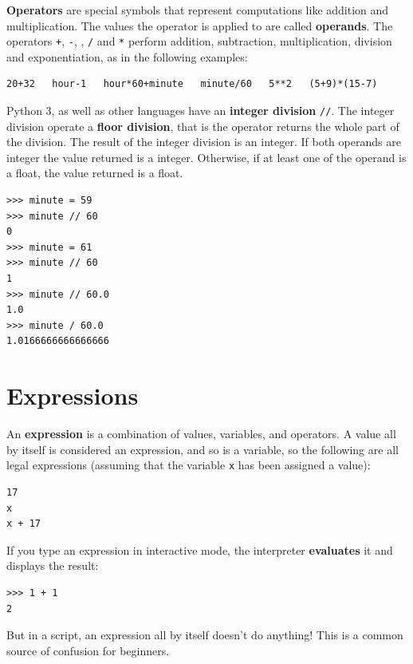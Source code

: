 {\bf Operators} are special symbols that represent computations like
addition and multiplication.  The values the operator is applied to
are called {\bf operands}.
The operators {\tt +}, {\tt -}, {\tt *}, {\tt /} and {\tt **}
perform addition, subtraction, multiplication, division and
exponentiation, as in the following examples:

\beforeverb
\begin{verbatim}
20+32   hour-1   hour*60+minute   minute/60   5**2   (5+9)*(15-7)
\end{verbatim}
\afterverb
%


Python 3, as well as other languages have an {\bf integer division} {\tt //}. The integer division operate a {\bf floor division}, that is the operator returns the whole part of the division. The result of the integer division  is an integer. If both operands are integer the value returned is a integer. Otherwise, if at least one of the operand is a float, the value returned is a float.

\beforeverb
\begin{verbatim}
>>> minute = 59
>>> minute // 60
0
>>> minute = 61
>>> minute // 60
1
>>> minute // 60.0
1.0
>>> minute / 60.0
1.0166666666666666
\end{verbatim}
\afterverb
%

\section{Expressions}

An {\bf expression} is a combination of values, variables, and operators.
A value all by itself is considered an expression, and so is
a variable, so the following are all legal expressions
(assuming that the variable {\tt x} has been assigned a value):


\beforeverb
\begin{verbatim}
17
x
x + 17
\end{verbatim}
\afterverb
%
If you type an expression in interactive mode, the interpreter
{\bf evaluates} it and displays the result:

\beforeverb
\begin{verbatim}
>>> 1 + 1
2
\end{verbatim}
\afterverb
%
But in a script, an expression all by itself doesn't
do anything!  This is a common
source of confusion for beginners.

